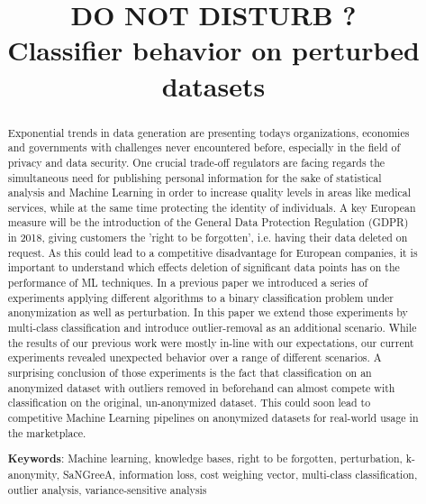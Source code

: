 \documentclass{llncs}
\begin{document}
\title{DO NOT DISTURB ? \\ Classifier behavior on perturbed datasets}


	
\maketitle

\begin{abstract}

Exponential trends in data generation are presenting todays organizations, economies and governments with challenges never encountered before, especially in the field of privacy and data security. One crucial trade-off regulators are facing regards the simultaneous need for publishing personal information for the sake of statistical analysis and Machine Learning in order to increase quality levels in areas like medical services, while at the same time protecting the identity of individuals. A key European measure will be the introduction of the General Data Protection Regulation (GDPR) in 2018, giving customers the 'right to be forgotten', i.e. having their data deleted on request. As this could lead to a competitive disadvantage for European companies, it is important to understand which effects deletion of significant data points has on the performance of ML techniques. In a previous paper we introduced a series of experiments applying different algorithms to a binary classification problem under anonymization as well as perturbation. In this paper we extend those experiments by multi-class classification and introduce outlier-removal as an additional scenario. While the results of our previous work were mostly in-line with our expectations, our current experiments revealed unexpected behavior over a range of different scenarios. A surprising conclusion of those experiments is the fact that classification on an anonymized dataset with outliers removed in beforehand can almost compete with classification on the original, un-anonymized dataset. This could soon lead to competitive Machine Learning pipelines on anonymized datasets for real-world usage in the marketplace.


\medskip

\textbf{Keywords}: Machine learning, knowledge bases, right to be forgotten, perturbation, k-anonymity, SaNGreeA, information loss, cost weighing vector, multi-class classification, outlier analysis, variance-sensitive analysis


\end{abstract}
\end{document}
